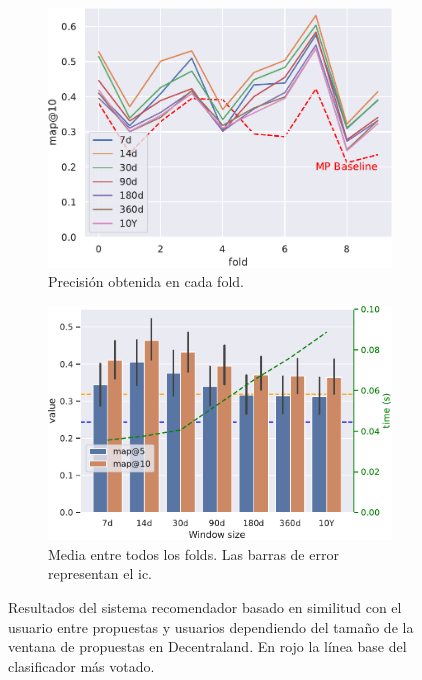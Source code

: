 \begin{figure}[t]
    \begin{subfigure}{.48\textwidth}
        \centering
        \includegraphics[width=\linewidth]{figures/04_implementacion/11_cosine_results_results-lines_W-THU_normalize=True.pdf}
        \caption{Precisión obtenida en cada fold.}
    \end{subfigure}\hfill\begin{subfigure}{.48\textwidth}
        \centering
        \includegraphics[width=\linewidth]{figures/04_implementacion/11_cosine_results_window-size_W-THU_normalize=True.pdf}
        \caption{Media entre todos los folds. Las barras de error representan el \acrshort{ic}.}
        \label{fig:pln-similarity_window-size}
    \end{subfigure}
    \caption[Resultados del sistema recomendador basado en similitud del coseno en Decentraland.]{Resultados del sistema recomendador basado en similitud con el usuario entre propuestas y usuarios dependiendo del tamaño de la ventana de propuestas en Decentraland. En rojo la línea base del clasificador más votado.}
    \label{fig:pln-similairity_results}
\end{figure}

